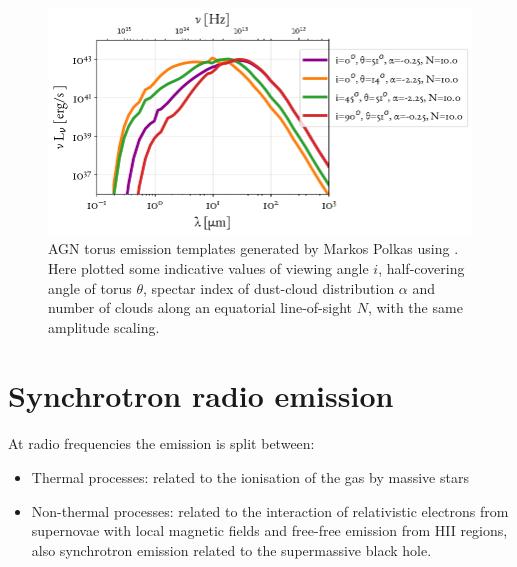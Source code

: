\begin{figure}
\centering
  \includegraphics[width = \textwidth]{figures/Templates/Torus_T.png}
 \caption{AGN torus emission templates generated by Markos Polkas using \cite{HonigKishi2010}. Here plotted some indicative values of viewing angle $i$, half-covering angle of torus $\theta$, spectar index of dust-cloud distribution $\alpha$ and number of clouds along an equatorial line-of-sight $N$, with the same amplitude scaling. }
  \label{fig:Torus_temp}
\end{figure}


\section{Synchrotron radio emission}\label{sec:SED/radio}
At radio frequencies the emission is split between:
\begin{itemize}
    \item Thermal processes: related to the ionisation of the gas by massive stars
    \item Non-thermal processes: related to the interaction of relativistic electrons from supernovae with local magnetic fields and free-free emission from HII regions, also synchrotron emission related to the supermassive black hole.
\end{itemize}

